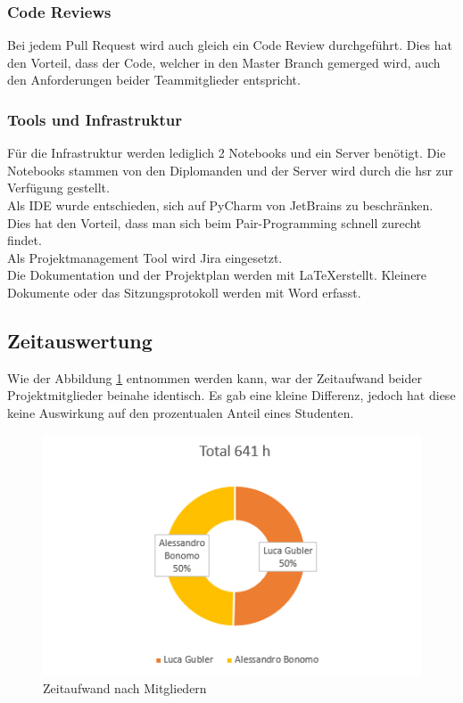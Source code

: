 \subsubsection*{Code Reviews}
Bei jedem Pull Request wird auch gleich ein Code Review durchgeführt. Dies hat den Vorteil, dass der Code, welcher in den Master Branch gemerged wird, auch den Anforderungen beider Teammitglieder entspricht.

\subsubsection*{Tools und Infrastruktur}
Für die Infrastruktur werden lediglich 2 Notebooks und ein Server benötigt. Die Notebooks stammen von den Diplomanden und der Server wird durch die \gls{hsr} zur Verfügung gestellt. \\
Als IDE wurde entschieden, sich auf PyCharm von JetBrains zu beschränken. Dies hat den Vorteil, dass man sich beim Pair-Programming schnell zurecht findet. \\
Als Projektmanagement Tool wird Jira eingesetzt. \\
Die Dokumentation und der Projektplan werden mit \LaTeX erstellt. Kleinere Dokumente oder das Sitzungsprotokoll werden mit Word erfasst. 

\newpage


\subsection{Zeitauswertung}
Wie der Abbildung \ref{time_per_student} entnommen werden kann, war der Zeitaufwand beider Projektmitglieder beinahe identisch. Es gab eine kleine Differenz, jedoch hat diese keine Auswirkung auf den prozentualen Anteil eines Studenten.

\begin{minipage}{\textwidth}
	\begin{figure}[H]
		\includegraphics[width=\textwidth, height=\textheight, keepaspectratio]{images/Zeitauswertung/Arbeitsaufwand_Personen.png}
		\caption{Zeitaufwand nach Mitgliedern}
		\label{time_per_student}
	\end{figure}
\end{minipage}


